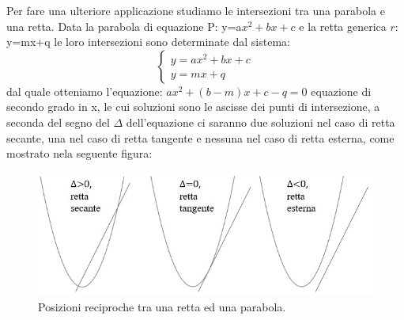Per fare una ulteriore applicazione studiamo le intersezioni tra una 
parabola e una retta.
Data la parabola di equazione P: y=a$ x^{2}+bx+c$ e la retta generica $r$: 
y=mx+q le loro intersezioni sono determinate dal sistema:
\[\begin{cases}  y=a x^{2} +bx+c   \\ y=mx+q  
\end{cases}\]
dal quale otteniamo l'equazione:
$ax^{2} +(b-m)x+c-q=0$
equazione di secondo grado in x, le cui soluzioni sono le ascisse dei punti 
di intersezione, a seconda del segno del $ \Delta $ dell'equazione ci 
saranno due soluzioni nel caso di retta secante, una nel caso di retta 
tangente e nessuna nel caso di retta esterna, come mostrato nela seguente 
figura:
\begin{figure}[htbp]
  \centering
  \includegraphics[scale=0.6]{img/rettaconica3.jpg}
  \caption{Posizioni reciproche tra una retta ed una parabola.}%
\end{figure}

